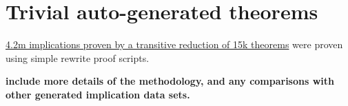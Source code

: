\chapter{Trivial auto-generated theorems}

\href{https://github.com/teorth/equational_theories/tree/main/equational_theories/Generated/TrivialBruteforce/theorems}{4.2m implications proven by a transitive reduction of 15k theorems} were proven using simple rewrite proof scripts.

{\bf include more details of the methodology, and any comparisons with other generated implication data sets.}
